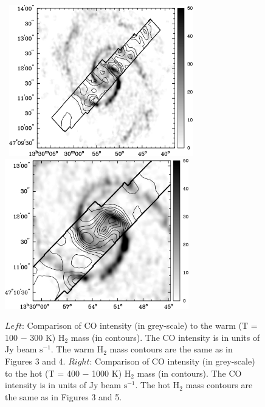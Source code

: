 \documentclass[manuscript]{aastex}
\begin{document}
\clearpage


\begin{figure}[!h]
\centerline{\hbox{\hspace{0.0in}
\includegraphics[width=8cm,angle=0]{bw_co_v_warm.jpg}
\hspace{0.1in}
\includegraphics[width=8cm,angle=0]{bw_co_v_hot.jpg}}}
\caption{$Left$: Comparison of  CO intensity (in grey-scale) to the warm (T = 100 $-$ 300 K) $\mathrm{H_2}$ mass (in contours).  The CO intensity is in units of Jy beam $\mathrm{s^{-1}}$. The warm $\mathrm{H_2}$ mass contours are the same as in Figures 3 and 4.  $Right$: Comparison of CO intensity (in grey-scale) to the hot (T = 400 $-$ 1000 K) $\mathrm{H_2}$ mass (in contours).  The CO intensity is in units of Jy beam $\mathrm{s^{-1}}$. The hot $\mathrm{H_2}$ mass contours are the same as in Figures 3 and 5.
\label{fig7}}
\end{figure}

\clearpage
\end{document}

